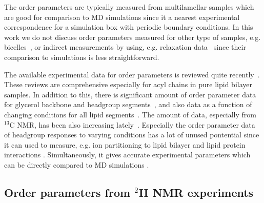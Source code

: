 \documentclass[aps,prl,superscriptaddress,twocolumn]{revtex4}
\begin{document}




The order parameters are typically measured from multilamellar samples which are good for comparison to MD 
simulations since it a nearest experimental correspondence for a simulation box with periodic boundary conditions. 
In this work we do not discuss order parameters measured for other type of samples, 
e.g. bicelles~\cite{aussenac03,raffard00,sanders92}, or indirect measurements by using, e.g. relaxation
data~\cite{marbella15} since their comparison to simulations is less straightforward.  

The available experimental data for order parameters is reviewed
quite recently~\cite{leftin11,marsh13}. These reviews are comprehensive especially for 
acyl chains in pure lipid bilayer samples. In addition to this, there is significant
amount of order parameter data for glycerol backbone and headgroup segments~\cite{botan15}, and
also data as a function of changing conditions for all lipid segments~\cite{akutsu81,altenbach84,scherer89,kuchinka89,roux90,ulrich94,douliez95,dvinskikh05a,mallikarjunaiah11,ferreira13,leftin13,leftin14}.
The amount of data, especially from $^{13}$C NMR, has been also increasing lately~\cite{ferreira13,leftin13,leftin14}.
Especially the order parameter data of headgroup responses to varying conditions 
has a lot of unused pontential since it can used to measure, e.g. ion partitioning to lipid
bilayer \cite{akutsu81,altenbach84,seelig87,scherer89,ionpaper} and lipid protein interactions \cite{roux89,kuchinka89,leftin13}. Simultaneously, it
gives accurate experimental parameters which can be directly compared to MD simulations \cite{botan15,ionpaper}.




 

\subsection{Order parameters from $^2$H NMR experiments}\label{DopSECTION}
\end{document}
